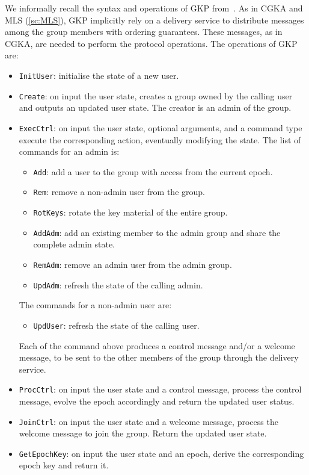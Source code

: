 We informally recall the syntax and operations of GKP from~\cite{GKP}.
As in CGKA and MLS (\cref{sc:MLS}), GKP implicitly rely on a delivery service
to distribute messages among the group members with ordering guarantees.
These messages, as in CGKA, are needed to perform the protocol operations.
The operations of GKP are:
\begin{itemize}
    \item \texttt{InitUser}: initialise the state of a new user.
    \item \texttt{Create}: on input the user state, creates a group owned by the calling user and outputs an updated user state. The creator is an admin of the group.
    \item \texttt{ExecCtrl}: on input the user state, optional arguments, and a command type execute the corresponding action, eventually modifying the state. The list of commands for an admin is:
    \begin{itemize}
        \item \texttt{Add}: add a user to the group with access from the current epoch.
        \item \texttt{Rem}: remove a non-admin user from the group.
        \item \texttt{RotKeys}: rotate the key material of the entire group.
        \item \texttt{AddAdm}: add an existing member to the admin group and share the complete admin state.
        \item \texttt{RemAdm}: remove an admin user from the admin group.
        \item \texttt{UpdAdm}: refresh the state of the calling admin. 
    \end{itemize}
    The commands for a non-admin user are:
    \begin{itemize}
        \item \texttt{UpdUser}: refresh the state of the calling user.
    \end{itemize}
    Each of the command above produces a control message and/or a welcome message, to be sent to the other members of the group through the delivery service.
    \item \texttt{ProcCtrl}: on input the user state and a control message, process the control message, evolve the epoch accordingly and return the updated user status.
    \item \texttt{JoinCtrl}: on input the user state and a welcome message, process the welcome message to join the group. Return the updated user state.
    \item \texttt{GetEpochKey}: on input the user state and an epoch, derive the corresponding epoch key and return it.
\end{itemize}

